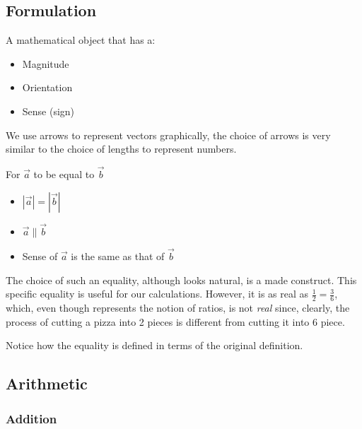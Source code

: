 
\subsection{Formulation}
\label{sub:vector-formulation}

\begin{definition}[Vector]
    A mathematical object that has a:
    \begin{itemize}
        \item Magnitude
        \item Orientation
        \item Sense (sign)
    \end{itemize}
\end{definition}

We use arrows to represent vectors graphically, the choice of arrows is very similar to the choice of lengths to represent numbers.

\begin{definition}
    For $\vec{a}$ to be equal to $\vec{b}$
    \begin{itemize}
        \item $|\vec{a}| = |\vec{b}|$
        \item $\vec{a} \parallel \vec{b}$
        \item Sense of $\vec{a}$ is the same as that of $\vec{b}$
    \end{itemize}
\end{definition}

The choice of such an equality, although looks natural, is a made construct. This specific equality is useful for our calculations. However, it is as real as $\frac{1}{2}=\frac{3}{6}$, which, even though represents the notion of ratios, is not \textit{real} since, clearly, the process of cutting a pizza into 2 pieces is different from cutting it into 6 piece.

\begin{note}
    Notice how the equality is defined in terms of the original definition.
\end{note}

\subsection{Arithmetic}%
\label{sub:vector-arithmetic}

\subsubsection{Addition}%
\label{ssub:vector-addition}

